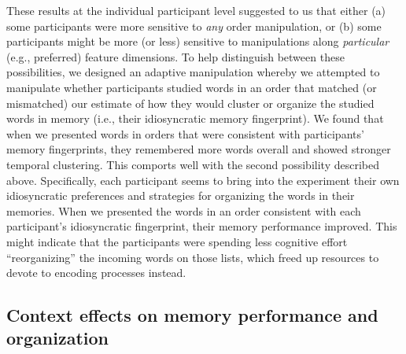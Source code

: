 \documentclass[11pt]{article}
\begin{document}
These results at the individual participant level suggested to us that either
(a) some participants were more sensitive to \textit{any} order manipulation,
or (b) some participants might be more (or less) sensitive to manipulations
along \textit{particular} (e.g., preferred) feature dimensions. To help
distinguish between these possibilities, we designed an adaptive manipulation
whereby we attempted to manipulate whether participants studied words in an
order that matched (or mismatched) our estimate of how they would cluster or
organize the studied words in memory (i.e., their idiosyncratic memory
fingerprint). We found that when we presented words in orders that were
consistent with participants' memory fingerprints, they remembered more words
overall and showed stronger temporal clustering. This comports well with the
second possibility described above. Specifically, each participant seems to
bring into the experiment their own idiosyncratic preferences and strategies
for organizing the words in their memories. When we presented the words in an
order consistent with each participant's idiosyncratic fingerprint, their
memory performance improved. This might indicate that the participants were
spending less cognitive effort ``reorganizing'' the incoming words on those
lists, which freed up resources to devote to encoding processes instead.


\subsection*{Context effects on memory performance and organization}
\end{document}
